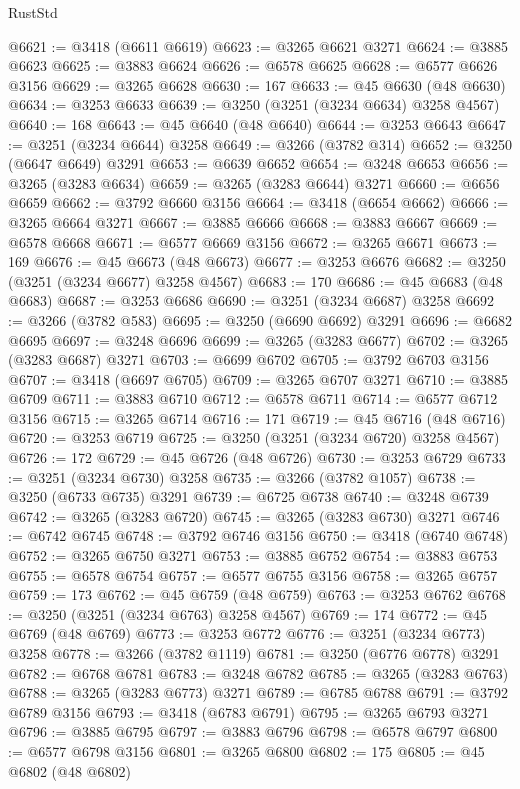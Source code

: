 \begin{lexlean}{RustStd}
\begin{coremodule}
@6621 := @3418 (@6611 @6619)
@6623 := @3265 @6621 @3271
@6624 := @3885 @6623
@6625 := @3883 @6624
@6626 := @6578 @6625
@6628 := @6577 @6626 @3156
@6629 := @3265 @6628
@6630 := 167
@6633 := @45 @6630 (@48 @6630)
@6634 := @3253 @6633
@6639 := @3250 (@3251 (@3234 @6634) @3258 @4567)
@6640 := 168
@6643 := @45 @6640 (@48 @6640)
@6644 := @3253 @6643
@6647 := @3251 (@3234 @6644) @3258
@6649 := @3266 (@3782 @314)
@6652 := @3250 (@6647 @6649) @3291
@6653 := @6639 @6652
@6654 := @3248 @6653
@6656 := @3265 (@3283 @6634)
@6659 := @3265 (@3283 @6644) @3271
@6660 := @6656 @6659
@6662 := @3792 @6660 @3156
@6664 := @3418 (@6654 @6662)
@6666 := @3265 @6664 @3271
@6667 := @3885 @6666
@6668 := @3883 @6667
@6669 := @6578 @6668
@6671 := @6577 @6669 @3156
@6672 := @3265 @6671
@6673 := 169
@6676 := @45 @6673 (@48 @6673)
@6677 := @3253 @6676
@6682 := @3250 (@3251 (@3234 @6677) @3258 @4567)
@6683 := 170
@6686 := @45 @6683 (@48 @6683)
@6687 := @3253 @6686
@6690 := @3251 (@3234 @6687) @3258
@6692 := @3266 (@3782 @583)
@6695 := @3250 (@6690 @6692) @3291
@6696 := @6682 @6695
@6697 := @3248 @6696
@6699 := @3265 (@3283 @6677)
@6702 := @3265 (@3283 @6687) @3271
@6703 := @6699 @6702
@6705 := @3792 @6703 @3156
@6707 := @3418 (@6697 @6705)
@6709 := @3265 @6707 @3271
@6710 := @3885 @6709
@6711 := @3883 @6710
@6712 := @6578 @6711
@6714 := @6577 @6712 @3156
@6715 := @3265 @6714
@6716 := 171
@6719 := @45 @6716 (@48 @6716)
@6720 := @3253 @6719
@6725 := @3250 (@3251 (@3234 @6720) @3258 @4567)
@6726 := 172
@6729 := @45 @6726 (@48 @6726)
@6730 := @3253 @6729
@6733 := @3251 (@3234 @6730) @3258
@6735 := @3266 (@3782 @1057)
@6738 := @3250 (@6733 @6735) @3291
@6739 := @6725 @6738
@6740 := @3248 @6739
@6742 := @3265 (@3283 @6720)
@6745 := @3265 (@3283 @6730) @3271
@6746 := @6742 @6745
@6748 := @3792 @6746 @3156
@6750 := @3418 (@6740 @6748)
@6752 := @3265 @6750 @3271
@6753 := @3885 @6752
@6754 := @3883 @6753
@6755 := @6578 @6754
@6757 := @6577 @6755 @3156
@6758 := @3265 @6757
@6759 := 173
@6762 := @45 @6759 (@48 @6759)
@6763 := @3253 @6762
@6768 := @3250 (@3251 (@3234 @6763) @3258 @4567)
@6769 := 174
@6772 := @45 @6769 (@48 @6769)
@6773 := @3253 @6772
@6776 := @3251 (@3234 @6773) @3258
@6778 := @3266 (@3782 @1119)
@6781 := @3250 (@6776 @6778) @3291
@6782 := @6768 @6781
@6783 := @3248 @6782
@6785 := @3265 (@3283 @6763)
@6788 := @3265 (@3283 @6773) @3271
@6789 := @6785 @6788
@6791 := @3792 @6789 @3156
@6793 := @3418 (@6783 @6791)
@6795 := @3265 @6793 @3271
@6796 := @3885 @6795
@6797 := @3883 @6796
@6798 := @6578 @6797
@6800 := @6577 @6798 @3156
@6801 := @3265 @6800
@6802 := 175
@6805 := @45 @6802 (@48 @6802)

\end{coremodule}
\end{lexlean}
